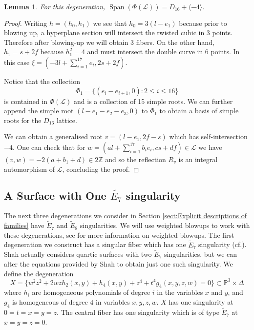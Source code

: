 \documentclass[a4paper]{amsart}
\theoremstyle{definition}
\theoremstyle{plain}
\newtheorem{lemma}[defn]{Lemma}
\theoremstyle{remark}
\newcommand{\Z}{\mathbb{Z}}
\begin{document}
\begin{lemma}
For this degeneration, $\operatorname{Span}(\Phi(\mathscr{L}))=D_{16}+\langle -4 \rangle$.
\end{lemma}

\begin{proof}
Writing $h=(h_0,h_1)$ we see that $h_0 = 3(l-e_1)$ because prior to blowing up, a hyperplane section will intersect the twisted cubic in 3 points. Therefore after blowing-up we will obtain 3 fibers. On the other hand, $h_1=s+2f$ because $h_1^2=4$ and must intersect the double curve in 6 points. In this case $\xi=(-3l+\sum_{i=1}^{17}e_i,2s+2f)$.

Notice that the collection 
$$\Phi_1 = \{(e_i-e_{i+1},0) : 2\leq i\leq 16 \}$$
is contained in $\Phi(\mathscr{L})$ and is a collection of 15 simple roots. We can further append the simple root $(l-e_1-e_2-e_3,0)$ to $\Phi_1$ to obtain a basis of simple roots for the $D_{16}$ lattice.

We can obtain a generalised root $v=(l-e_1,2f-s)$ which has self-intersection $-4$. One can check that for $w = (al+\sum_{i=1}^{17}b_ie_i,cs+df)\in \mathscr{L}$ we have $(v,w) = -2(a+b_1+d)\in2\Z$ and so the reflection $R_v$ is an integral automorphism of $\mathscr{L}$, concluding the proof.
\end{proof}

\subsection{A Surface with One $\widetilde{E_7}$ singularity}\label{sect: E7 singularity}
The next three degenerations we consider in Section \ref{sect:Explicit descriptions of families} have $\widetilde{E}_7$ and $\widetilde{E}_8$ singularities. We will use weighted blowups to work with these degenerations, see \cite[6.38]{KSC04} for more information on weighted blowups. The first degeneration we construct has a singular fiber which has one $\widetilde{E}_7$ singularity (cf.\cite[SS-2.1]{Shah81}). Shah actually considers quartic surfaces with two $\widetilde{E}_7$ singularities, but we can alter the equations provided by Shah to obtain just one such singularity. We define the degeneration
$$X = \{w^2z^2+2wzh_2(x,y)+h_4(x,y) +z^4 +t^4g_4(x,y,z,w)=0\} \subset \mathbb{P}^3 \times \Delta$$
where $h_i$ are homogeneous polynomials of degree $i$ in the variables $x$ and $y$, and $g_4$ is homogeneous of degree 4 in variables $x,y,z,w$. $X$ has one singularity at $0=t=x=y=z$. The central fiber has one singularity which is of type $\widetilde{E}_7$ at $x=y=z=0$.
\end{document}

